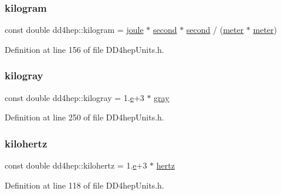 \subsubsection{\texorpdfstring{kilogram}{kilogram}}
{\footnotesize\ttfamily const double dd4hep\+::kilogram = \hyperlink{namespacedd4hep_a8cdc11c61e5f953baede59569544a324}{joule} $\ast$ \hyperlink{namespacedd4hep_ac03364576705a245265d8ed6ea26b871}{second} $\ast$ \hyperlink{namespacedd4hep_ac03364576705a245265d8ed6ea26b871}{second} / (\hyperlink{namespacedd4hep_a46f5cf0231796af4296a307a58812b06}{meter} $\ast$ \hyperlink{namespacedd4hep_a46f5cf0231796af4296a307a58812b06}{meter})\hspace{0.3cm}{\ttfamily [static]}}



Definition at line 156 of file D\+D4hep\+Units.\+h.

\hypertarget{namespacedd4hep_a865c3d39459c3a51f6ac00236482908a}{}\label{namespacedd4hep_a865c3d39459c3a51f6ac00236482908a} 
\subsubsection{\texorpdfstring{kilogray}{kilogray}}
{\footnotesize\ttfamily const double dd4hep\+::kilogray = 1.\hyperlink{_volumes_8cpp_a8a9a1f93e9b09afccaec215310e64142}{e}+3 $\ast$ \hyperlink{namespacedd4hep_a35738d027f0d6649943f74cfc26bb7fc}{gray}\hspace{0.3cm}{\ttfamily [static]}}



Definition at line 250 of file D\+D4hep\+Units.\+h.

\hypertarget{namespacedd4hep_a047776833f7632dfbfa1b7e4aa17ffd0}{}\label{namespacedd4hep_a047776833f7632dfbfa1b7e4aa17ffd0} 
\subsubsection{\texorpdfstring{kilohertz}{kilohertz}}
{\footnotesize\ttfamily const double dd4hep\+::kilohertz = 1.\hyperlink{_volumes_8cpp_a8a9a1f93e9b09afccaec215310e64142}{e}+3 $\ast$ \hyperlink{namespacedd4hep_a5ada76b9ea37d13e1e346f2256017cff}{hertz}\hspace{0.3cm}{\ttfamily [static]}}



Definition at line 118 of file D\+D4hep\+Units.\+h.

